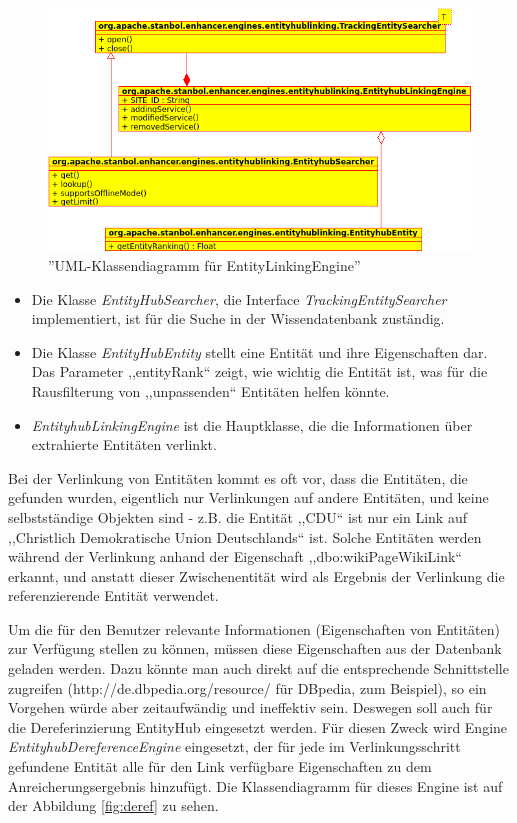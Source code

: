 \begin{figure}[ht]
\centering
\includegraphics[width=\textwidth]{Bilder/classes-linking.png}
\caption{''UML-Klassendiagramm für EntityLinkingEngine''}
\label{fig:linking}
\end{figure}
\begin{itemize}
\item Die Klasse \textit{EntityHubSearcher}, die Interface \textit{TrackingEntitySearcher} implementiert, ist für die Suche in der Wissendatenbank zuständig.
\item Die Klasse \textit{EntityHubEntity} stellt eine Entität und ihre Eigenschaften dar. Das Parameter ,,entityRank`` zeigt, wie wichtig die Entität ist, was für die Rausfilterung von ,,unpassenden`` Entitäten helfen könnte.
\item \textit{EntityhubLinkingEngine} ist die Hauptklasse, die die Informationen über extrahierte Entitäten verlinkt.
\end{itemize}

Bei der Verlinkung von Entitäten kommt es oft vor, dass die Entitäten, die gefunden wurden, eigentlich nur Verlinkungen auf andere Entitäten, und keine selbstständige Objekten sind - z.B. die Entität ,,CDU`` ist nur ein Link auf ,,Christlich Demokratische Union Deutschlands`` ist. Solche Entitäten werden während der Verlinkung anhand der Eigenschaft ,,dbo:wikiPageWikiLink`` erkannt, und anstatt dieser Zwischenentität wird als Ergebnis der Verlinkung die referenzierende Entität verwendet.

Um die für den Benutzer relevante Informationen (Eigenschaften von Entitäten) zur Verfügung stellen zu können, müssen diese Eigenschaften aus der Datenbank geladen werden. Dazu könnte man auch direkt auf die entsprechende Schnittstelle zugreifen (http://de.dbpedia.org/resource/ für DBpedia, zum Beispiel), so ein Vorgehen würde aber zeitaufwändig und ineffektiv sein. Deswegen soll auch für die Dereferinzierung EntityHub eingesetzt werden. Für diesen Zweck wird Engine \textit{EntityhubDereferenceEngine} eingesetzt, der für jede im Verlinkungsschritt gefundene Entität alle für den Link verfügbare Eigenschaften zu dem Anreicherungsergebnis hinzufügt. Die Klassendiagramm für dieses Engine ist auf der Abbildung \ref{fig:deref} zu sehen. 

